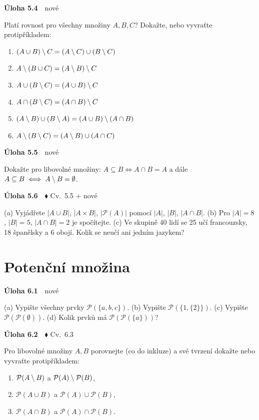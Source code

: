 \documentclass[11pt,a4paper]{article}
\newenvironment{pol}{\begin{enumerate}[label=(\alph*),leftmargin=2em,itemsep=3pt]}{\end{enumerate}}
\newenvironment{uloha}[2]{\Needspace{6\baselineskip}\par\vspace{6pt}\noindent\textbf{Úloha #1}\ \ {\footnotesize\color{gray}#2}\par\vspace{2pt}}{\par\vspace{4pt}}
\begin{document}
\begin{uloha}{5.4}{nové}
Platí rovnost pro všechny množiny $A,B,C$? Dokažte, nebo vyvraťte protipříkladem:
\begin{pol}
  \item $(A\cup B)\setminus C=(A\setminus C)\cup(B\setminus C)$
  \item $A\setminus(B\cup C)=(A\setminus B)\setminus C$
  \item $A\cup(B\setminus C)=(A\cup B)\setminus C$
  \item $A\cap(B\setminus C)=(A\cap B)\setminus C$
  \item $(A\setminus B)\cup(B\setminus A)=(A\cup B)\setminus(A\cap B)$
  \item $A\setminus(B\setminus C)=(A\setminus B)\cup(A\cap C)$
\end{pol}

\end{uloha}

\begin{uloha}{5.5}{nové}
Dokažte pro libovolné množiny: $A\subseteq B\iff A\cap B=A$ a dále $A\subseteq B\iff A\setminus B=\emptyset$.

\end{uloha}

\begin{uloha}{5.6}{$\blacklozenge$ Cv.~5.5 + nové}
(a) Vyjádřete $|A\cup B|$, $|A\times B|$, $|\mathcal P(A)|$ pomocí $|A|$, $|B|$, $|A\cap B|$. (b) Pro $|A|=8$, $|B|=5$, $|A\cap B|=2$ je spočítejte. (c) Ve skupině 40 lidí se 25 učí francouzsky, 18 španělsky a 6 obojí. Kolik se neučí ani jedním jazykem?

\end{uloha}

\section{Potenční množina}

\begin{uloha}{6.1}{nové}
(a) Vypište všechny prvky $\mathcal P(\{a,b,c\})$. (b) Vypište $\mathcal P(\{1,\{2\}\})$. (c) Vypište $\mathcal P(\mathcal P(\emptyset))$. (d) Kolik prvků má $\mathcal P(\mathcal P(\{a\}))$?

\end{uloha}

\begin{uloha}{6.2}{$\blacklozenge$ Cv.~6.3}
Pro libovolné množiny $A,B$ porovnejte (co do inkluze) a své tvrzení dokažte nebo vyvraťte protipříkladem:
\begin{pol}
  \item $\mathcal P(A\setminus B)$ a $\mathcal P(A)\setminus\mathcal P(B)$,
  \item $\mathcal P(A\cup B)$ a $\mathcal P(A)\cup\mathcal P(B)$,
  \item $\mathcal P(A\cap B)$ a $\mathcal P(A)\cap\mathcal P(B)$.
\end{pol}


\end{uloha}
\end{document}
